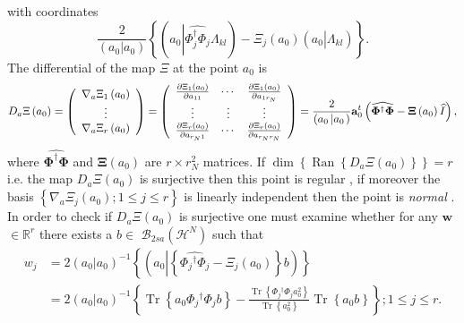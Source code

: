 \documentclass[aps,preprint]{revtex4}%
\begin{document}
with coordinates
\begin{equation}
\frac{2}{\left(  a_{0}\left\vert a_{0}\right.  \right)  }\left\{  \left(
a_{0}\left\vert \widehat{\Phi_{j}^{\dagger}\Phi_{j}}\right.  \Lambda
_{kl}\right)  -\Xi_{j}\left(  a_{0}\right)  \left(  a_{0}\left\vert \overset
{}{\Lambda_{kl}}\right.  \right)  \right\}  .
\end{equation}
The differential of the map $\Xi$ at the point $a_{0}$ is
\begin{equation}
D_{a}\Xi\left(  a_{0}\right)  =\left(
\begin{array}
[c]{c}%
\nabla_{a}\Xi_{1}\left(  a_{0}\right) \\
\vdots\\
\nabla_{a}\Xi_{r}\left(  a_{0}\right)
\end{array}
\right)  =\left(
\begin{array}
[c]{ccc}%
\frac{\partial\Xi_{1}\left(  a_{0}\right)  }{\partial a_{11}} & \cdots &
\frac{\partial\Xi_{1}\left(  a_{0}\right)  }{\partial a_{1r_{N}}}\\
\vdots & \vdots & \vdots\\
\frac{\partial\Xi_{r}\left(  a_{0}\right)  }{\partial a_{r_{N}1}} & \cdots &
\frac{\partial\Xi_{r}\left(  a_{0}\right)  }{\partial a_{r_{N}r_{N}}}%
\end{array}
\right)  =\frac{2}{\left(  a_{0}\left\vert a_{0}\right.  \right)  }%
\mathbf{a}_{0}^{t}\left(  \widehat{\mathbf{\Phi}^{\dagger}\mathbf{\Phi}%
}-\mathbf{\Xi}\left(  a_{0}\right)  \widehat{I}\right)  ,
\end{equation}
where $\widehat{\mathbf{\Phi}^{\dagger}\mathbf{\Phi}}$ and $\mathbf{\Xi
}\left(  a_{0}\right)  $ are $r\times r_{N}^{2}$ matrices. If $\dim\left\{
\operatorname{Ran}\left\{  D_{a}\Xi\left(  a_{0}\right)  \right\}  \right\}
=r$ i.e. the map $D_{a}\Xi\left(  a_{0}\right)  $ is surjective then this
point is regular \cite{Hestenes}, if moreover the basis $\left\{  \nabla
_{a}\Xi_{j}\left(  a_{0}\right)  ;1\leq j\leq r\right\}  $ is linearly
independent then the point is \emph{normal }\cite{Hestenes}. In order to check
if $D_{a}\Xi\left(  a_{0}\right)  $ is surjective one must examine whether for
any\textbf{ }$\mathbf{w}$\textbf{ }$\in\mathbb{R}^{r}$ there exists a $b\in$
$\mathcal{B}_{2sa}\left(  \mathcal{H}^{N}\right)  $ such that
\begin{align}
w_{j}  &  =2\left(  \overset{}{a_{0}}\left\vert a_{0}\right.  \right)
^{-1}\left\{  \left(  a_{0}\left\vert \left\{  \widehat{\Phi_{j}{}^{\dagger
}\Phi_{j}}-\Xi_{j}\left(  a_{0}\right)  \right\}  \right.  b\right)  \right\}
\nonumber\\
&  =2\left(  \overset{}{a_{0}}\left\vert a_{0}\right.  \right)  ^{-1}\left\{
\operatorname{Tr}\left\{  a_{0}\Phi_{j}{}^{\dagger}\Phi_{j}b\right\}
-\frac{\operatorname{Tr}\left\{  \Phi_{j}{}^{\dagger}\Phi_{j}a_{0}%
^{2}\right\}  }{\operatorname{Tr}\left\{  a_{0}^{2}\right\}  }%
\operatorname{Tr}\left\{  a_{0}b\right\}  \right\}  ;1\leq j\leq r\mathbf{.}%
\end{align}
\end{document}
